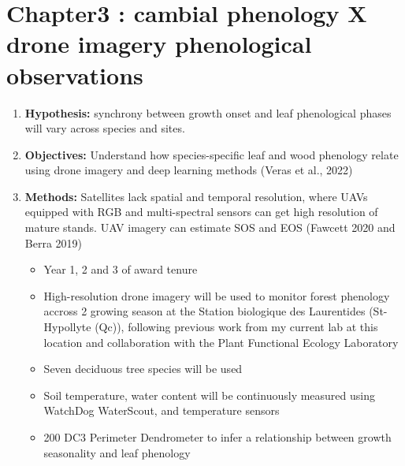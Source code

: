\documentclass{article}
\begin{document}
\section*{Chapter3 : cambial phenology X drone imagery phenological observations}
\begin {enumerate}
	\item \textbf{Hypothesis:} synchrony between growth onset and leaf phenological phases will vary across species and sites.
	\item \textbf{Objectives:} Understand how species-specific leaf and wood phenology relate using drone imagery and deep learning methods (Veras et al., 2022)
	\item \textbf{Methods:} Satellites lack spatial and temporal resolution, where UAVs equipped with RGB and multi-spectral sensors can get high resolution of mature stands. UAV imagery can estimate SOS and EOS (Fawcett 2020 and Berra 2019)
		\begin{itemize}
			\item Year 1, 2 and 3 of award tenure
			\item High-resolution drone imagery will be used to monitor forest phenology accross 2 growing season at the Station biologique des Laurentides (St-Hypollyte (Qc)), following previous work from my current lab at this location and collaboration with the Plant Functional Ecology Laboratory
			\item Seven deciduous tree species will be used 
			\item Soil temperature, water content will be continuously measured using WatchDog WaterScout, and temperature sensors
			\item 200 DC3 Perimeter Dendrometer to infer a relationship between growth seasonality and leaf phenology
		\end{itemize}
\end {enumerate}

%
\end{document}
